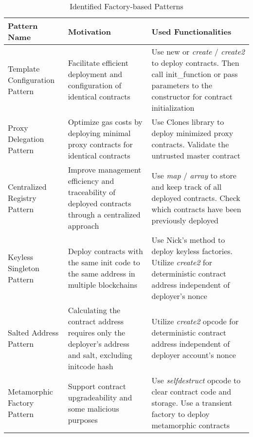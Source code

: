 \begin{table}[t]
	\centering
	\setlength{\extrarowheight}{1pt}
	\caption{Identified Factory-based Patterns}
	\label{tab:patterns} \scriptsize
	\begin{tabular}{|m{}|m{}|m{}|}
		\hline
		\textbf{Pattern Name}\centering & \textbf{Motivation}\centering                                                                           & \textbf{Used Functionalities}                                                                                                                                 \\
		\hline
		Template Configuration Pattern  & Facilitate efficient deployment and configuration of identical contracts                                & Use new or \textit{create} / \textit{create2} to deploy contracts. Then call init\_function or pass parameters to the constructor for contract initialization \\
		\hline
		Proxy Delegation Pattern        & Optimize gas costs by deploying minimal proxy contracts for identical contracts                         & Use Clones library to deploy minimized proxy contracts. Validate the untrusted master contract                                                                \\
		\hline
		Centralized Registry Pattern    & Improve management efficiency and traceability of deployed contracts through a centralized approach     & Use \textit{map} / \textit{array} to store and keep track of all deployed contracts. Check which contracts have been previously deployed                      \\
		\hline
		Keyless Singleton Pattern       & Deploy contracts with the same init code to the same address in multiple blockchains                    & Use Nick's method to deploy keyless factories. Utilize \textit{create2} for deterministic contract address independent of deployer's nonce                    \\
		\hline
		Salted Address Pattern          & Calculating the contract address requires only the deployer's address and salt, excluding initcode hash & Utilize \textit{create2} opcode for deterministic contract address independent of deployer account's nonce                                                    \\
		\hline
		Metamorphic Factory Pattern     & Support contract upgradeability and some malicious purposes                                             & Use \textit{selfdestruct} opcode to clear contract code and storage. Use a transient factory to deploy metamorphic contracts                                  \\
		\hline
	\end{tabular}
\end{table}
